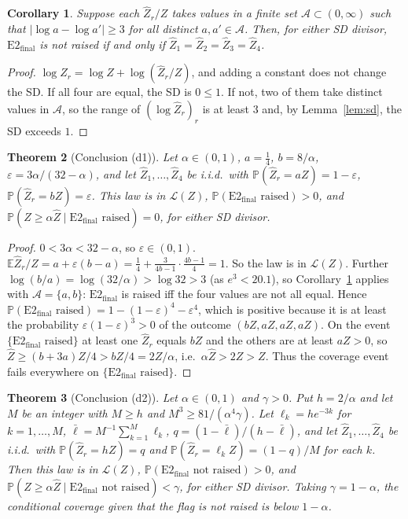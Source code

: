 \documentclass[11pt]{article}
\newtheorem{theorem}{Theorem}
\newtheorem{corollary}[theorem]{Corollary}
\theoremstyle{remark}
\newcommand{\Zh}{\widehat Z}
\newcommand{\cL}{\mathcal{L}}
\newcommand{\Etwo}{\mathrm{E2}_{\mathrm{final}}}
\begin{document}
\begin{corollary}\label{cor:flag}
Suppose each $\Zh_r/Z$ takes values in a finite set $\mathcal A\subset(0,\infty)$ such that $|\log a-\log a'|\ge3$ for all
distinct $a,a'\in\mathcal A$. Then, for either SD divisor, $\Etwo$ is not raised if and only if
$\Zh_1=\Zh_2=\Zh_3=\Zh_4$.
\end{corollary}

\begin{proof}
$\log\Zh_r=\log Z+\log(\Zh_r/Z)$, and adding a constant does not change the SD. If all four are equal, the SD is
$0\le1$. If not, two of them take distinct values in $\mathcal A$, so the range of $(\log\Zh_r)_r$ is at least $3$ and, by
Lemma~\ref{lem:sd}, the SD exceeds $1$.
\end{proof}

\begin{theorem}[Conclusion (d1)]\label{thm:d1}
Let $\alpha\in(0,1)$, $a=\tfrac14$, $b=8/\alpha$, $\varepsilon=3\alpha/(32-\alpha)$, and let $\Zh_1,\dots,\Zh_4$ be
i.i.d.\ with $\mathbb{P}(\Zh_r=aZ)=1-\varepsilon$, $\mathbb{P}(\Zh_r=bZ)=\varepsilon$. This law is in $\cL(Z)$,
$\mathbb{P}(\Etwo\text{ raised})>0$, and $\mathbb{P}(Z\ge\alpha\Zh\mid\Etwo\text{ raised})=0$, for either SD divisor.
\end{theorem}

\begin{proof}
$0<3\alpha<32-\alpha$, so $\varepsilon\in(0,1)$. $\mathbb{E}\Zh_r/Z=a+\varepsilon(b-a)=\tfrac14+\frac{3}{4b-1}\cdot
\frac{4b-1}{4}=1$. So the law is in $\cL(Z)$. Further $\log(b/a)=\log(32/\alpha)>\log32>3$ (as $e^3<20.1$), so
Corollary~\ref{cor:flag} applies with $\mathcal A=\{a,b\}$: $\Etwo$ is raised iff the four values are not all equal.
Hence $\mathbb{P}(\Etwo\text{ raised})=1-(1-\varepsilon)^4-\varepsilon^4$, which is positive because it is at least
the probability $\varepsilon(1-\varepsilon)^3>0$ of the outcome $(bZ,aZ,aZ,aZ)$. On the event $\{\Etwo\text{ raised}\}$ at
least one $\Zh_r$ equals $bZ$ and the others are at least $aZ>0$, so $\Zh\ge(b+3a)Z/4>bZ/4=2Z/\alpha$, i.e.\
$\alpha\Zh>2Z>Z$. Thus the coverage event fails everywhere on $\{\Etwo\text{ raised}\}$.
\end{proof}

\begin{theorem}[Conclusion (d2)]\label{thm:d2}
Let $\alpha\in(0,1)$ and $\gamma>0$. Put $h=2/\alpha$ and let $M$ be an integer with $M\ge h$ and
$M^3\ge81/(\alpha^4\gamma)$. Let $\ell_k=he^{-3k}$ for $k=1,\dots,M$, $\bar\ell=M^{-1}\sum_{k=1}^M\ell_k$,
$q=(1-\bar\ell)/(h-\bar\ell)$, and let $\Zh_1,\dots,\Zh_4$ be i.i.d.\ with $\mathbb{P}(\Zh_r=hZ)=q$ and
$\mathbb{P}(\Zh_r=\ell_kZ)=(1-q)/M$ for each $k$. Then this law is in $\cL(Z)$, $\mathbb{P}(\Etwo\text{ not raised})>0$,
and $\mathbb{P}(Z\ge\alpha\Zh\mid\Etwo\text{ not raised})<\gamma$, for either SD divisor. Taking $\gamma=1-\alpha$, the
conditional coverage given that the flag is not raised is below $1-\alpha$.
\end{theorem}
\end{document}
